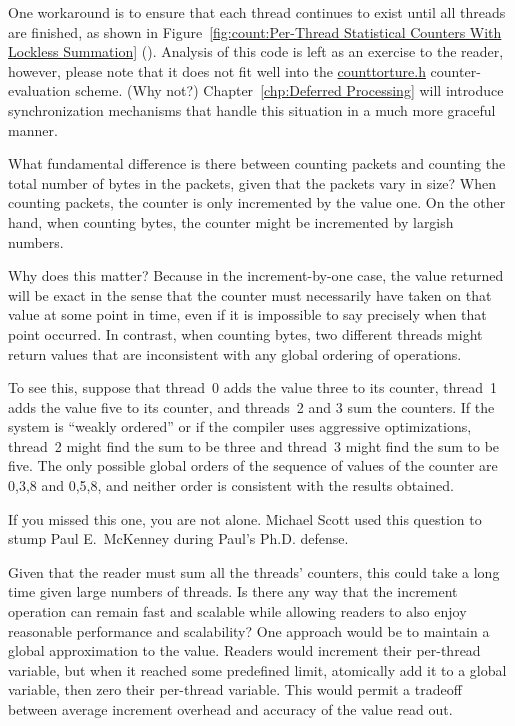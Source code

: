	One workaround is to ensure that each thread continues to exist
	until all threads are finished, as shown in
	Figure~\ref{fig:count:Per-Thread Statistical Counters With Lockless Summation}
	().
	Analysis of this code is left as an exercise to the reader,
	however, please note that it does not fit well into the
	\url{counttorture.h} counter-evaluation scheme.
	(Why not?)
	Chapter~\ref{chp:Deferred Processing} will introduce 
	synchronization mechanisms that handle this situation in a much
	more graceful manner.

\QuickQ{}
	What fundamental difference is there between counting packets
	and counting the total number of bytes in the packets, given
	that the packets vary in size?
\QuickA{}
	When counting packets, the counter is only incremented by the
	value one.
	On the other hand, when counting bytes, the counter might
	be incremented by largish numbers.

	Why does this matter?
	Because in the increment-by-one case, the value returned will
	be exact in the sense that the counter must necessarily have
	taken on that value at some point in time, even if it is impossible
	to say precisely when that point occurred.
	In contrast, when counting bytes, two different threads might
	return values that are inconsistent with any global ordering
	of operations.

	To see this, suppose that thread~0 adds the value three to its
	counter, thread~1 adds the value five to its counter, and
	threads~2 and 3 sum the counters.
	If the system is ``weakly ordered'' or if the compiler
	uses aggressive optimizations, thread~2 might find the
	sum to be three and thread~3 might find the sum to be five.
	The only possible global orders of the sequence of values
	of the counter are 0,3,8 and 0,5,8, and neither order is
	consistent with the results obtained.

	If you missed this one, you are not alone.
	Michael Scott used this question to stump Paul E.~McKenney
	during Paul's Ph.D. defense.

\QuickQ{}
	Given that the reader must sum all the threads' counters,
	this could take a long time given large numbers of threads.
	Is there any way that the increment operation can remain
	fast and scalable while allowing readers to also enjoy
	reasonable performance and scalability?
\QuickA{}
	One approach would be to maintain a global approximation
	to the value.
	Readers would increment their per-thread variable, but when it
	reached some predefined limit, atomically add it to a global
	variable, then zero their per-thread variable.
	This would permit a tradeoff between average increment overhead
	and accuracy of the value read out.

